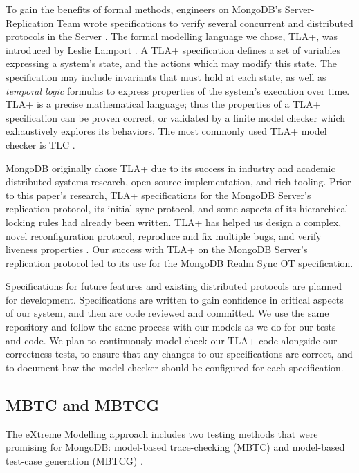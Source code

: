 \documentclass{vldb}
\begin{document}
To gain the benefits of formal methods, engineers on MongoDB's Server-Replication Team wrote specifications to verify several concurrent and distributed protocols in the Server \cite{Schultz19BugsLife}.
The formal modelling language we chose, TLA+, was introduced by Leslie Lamport \cite{Lamport99TLAPlus, Lamport02SpecifyingSystems}.
A TLA+ specification defines a set of variables expressing a system's state, and the actions which may modify this state.
The specification may include invariants that must hold at each state, as well as \textit{temporal logic} formulas to express properties of the system's execution over time.
TLA+ is a precise mathematical language; thus the properties of a TLA+ specification can be proven correct, or validated by a finite model checker which exhaustively explores its behaviors.
The most commonly used TLA+ model checker is TLC \cite{TLC}.

MongoDB originally chose TLA+ due to its success in industry and academic distributed systems research, open source implementation, and rich tooling.
Prior to this paper's research, TLA+ specifications for the MongoDB Server's replication protocol, its initial sync protocol, and some aspects of its hierarchical locking rules had already been written.
TLA+ has helped us design a complex, novel reconfiguration protocol, reproduce and fix multiple bugs, and verify liveness properties \cite{Schultz19BugsLife}.
Our success with TLA+ on the MongoDB Server's replication protocol led to its use for the MongoDB Realm Sync OT specification.

Specifications for future features and existing distributed protocols are planned for development.
Specifications are written to gain confidence in critical aspects of our system, and then are code reviewed and committed.
We use the same repository and follow the same process with our models as we do for our tests and code.
We plan to continuously model-check our TLA+ code alongside our correctness tests, to ensure that any changes to our specifications are correct, and to document how the model checker should be configured for each specification.

\subsection{MBTC and MBTCG}
\label{subsec:background_mbtc_mbt}

The eXtreme Modelling approach includes two testing methods that were promising for MongoDB: model-based trace-checking (MBTC) \cite{Jard83AnApproachToTestingSpecifications, MBTC} and model-based test-case generation (MBTCG) \cite{Utting06PracticalModelBasedTesting}. 
\end{document}
